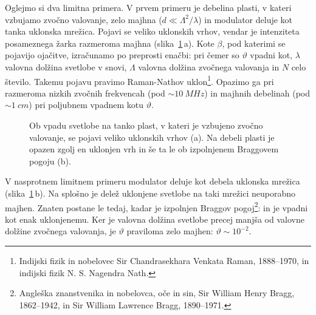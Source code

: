 Oglejmo si dva limitna primera. V prvem primeru je debelina plasti, 
v kateri vzbujamo zvočno valovanje, zelo majhna 
($d \ll \Lambda^2/\lambda$) in modulator deluje kot tanka uklonska mrežica.
Pojavi se veliko 
uklonskih vrhov, vendar je intenziteta posameznega žarka razmeroma 
majhna (slika~\ref{fig:ao_bragg}\,a). 
Kote $\beta$, pod katerimi se pojavijo ojačitve, izračunamo po preprosti enačbi:
pri čemer so $\vartheta$ vpadni kot, $\lambda$ valovna dolžina svetlobe v snovi, 
$\Lambda$ valovna dolžina zvočnega valovanja in 
$N$ celo število. Takemu pojavu 
pravimo Raman-Nathov uklon\footnote{Indijski fizik in nobelovec Sir Chandrasekhara 
Venkata Raman, 1888--1970, 
in indijski fizik N. S. Nagendra Nath.}. 
Opazimo ga pri razmeroma nizkih zvočnih frekvencah 
(pod $\sim10~\si{MHz}$) in majhnih debelinah (pod $\sim 1~\si{cm}$) pri poljubnem vpadnem 
kotu $\vartheta$.
\begin{figure}[ht]
\centering
\def\svgwidth{120truemm} 

\caption{Ob vpadu svetlobe na tanko plast, v kateri je vzbujeno zvočno valovanje, se 
pojavi veliko uklonskih vrhov (a). Na debeli plasti je opazen zgolj en uklonjen vrh in  
še ta le ob izpolnjenem Braggovem pogoju (b).}
\label{fig:ao_bragg}
\end{figure}

V nasprotnem limitnem primeru modulator deluje 
kot debela uklonska mrežica (slika~\ref{fig:ao_bragg}\,b). 
Na splošno je delež uklonjene svetlobe na taki mrežici neuporabno majhen. 
Znaten postane le tedaj, kadar je izpolnjen Braggov
pogoj\footnote{Angleška znanstvenika in nobelovca, oče in sin, Sir William Henry Bragg, 1862--1942,
in Sir William Lawrence Bragg, 1890--1971.}:
in je vpadni kot enak uklonjenemu.
Ker je valovna dolžina svetlobe precej manjša od valovne dolžine zvočnega valovanja, je $\vartheta$
praviloma zelo majhen: $\vartheta \sim 10^{-2}$. 


